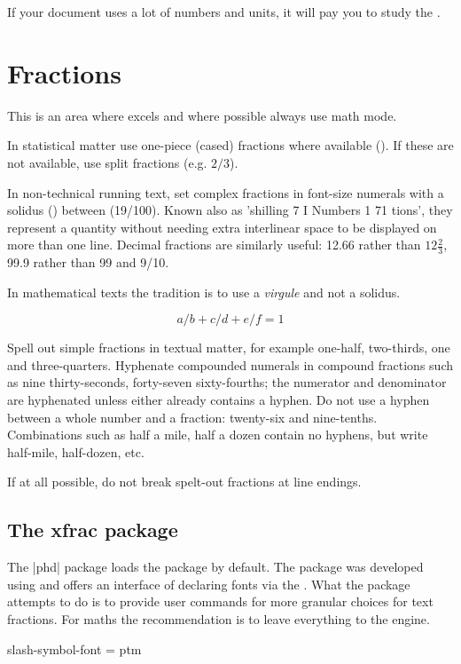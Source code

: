 If your document uses a lot of numbers and units, it will pay you to study the .

\section{Fractions}

This is an area where \tex excels and where possible always use math mode.

In statistical matter use one-piece (cased) fractions where available (\textonehalf). If these are not available, use split fractions (e.g. $2/3$).

In non-technical running text, set complex fractions in font-size numerals
with a solidus (\thinspace\textfractionsolidus\thinspace) between (19/100). Known also as 'shilling 
7 I Numbers 1 71
tions', they represent a quantity without needing extra interlinear space
to be displayed on more than one line. Decimal fractions are similarly
useful: 12.66 rather than $12\frac{2}{3}$, 99.9 rather than 99 and 9/10.

In mathematical texts the tradition is to use a \textit{virgule} and not a solidus.

\[ a/b + c/d + e/f = 1\]

Spell out simple fractions in textual matter, for example one-half, two-thirds,
one and three-quarters. Hyphenate compounded numerals in compound
fractions such as nine thirty-seconds, forty-seven sixty-fourths; the
numerator and denominator are hyphenated unless either already contains
a hyphen. Do not use a hyphen between a whole number and a
fraction: twenty-six and nine-tenths. Combinations such as half a mile, half a
dozen contain no hyphens, but write half-mile, half-dozen, etc. 

If at all possible, do not break spelt-out fractions at line endings.

\subsection{The xfrac package}

The |phd| package loads the package  by default. The package was developed using  and offers an interface of declaring fonts via the \cmd{\DeclareInstance}. What the package attempts to do is to provide user commands for more granular choices for text fractions. For maths the recommendation is to leave everything to the \tex engine.

{slash-symbol-font = ptm}

